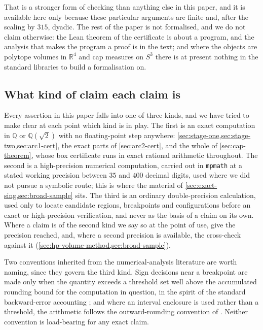 \documentclass[11pt,reqno]{amsart}
\renewcommand{\_}{\origunderscore\allowbreak}
\numberwithin{equation}{section}
\theoremstyle{plain}
\theoremstyle{definition}
\theoremstyle{remark}
\begin{document}
That is a stronger form of checking than anything else in this paper,
and it is available here only because these particular arguments are
finite and, after the scaling by $315$, dyadic. The rest of the paper
is not formalised, and we do not claim otherwise: the Lean theorem of
the certificate is about a program, and the analysis that makes the
program a proof is in the text; and where the objects are polytope
volumes in $\mathbb{R}^4$ and cap measures on $S^3$ there is at present
nothing in the standard libraries to build a formalisation on.

\subsection{What kind of claim each claim is}

Every assertion in this paper falls into one of three kinds, and we have
tried to make clear at each point which kind is in play. The first is an
exact computation in $\mathbb{Q}$ or $\mathbb{Q}(\sqrt2)$ with no
floating-point step anywhere:
\cref{sec:stage-one,sec:stage-two,sec:arc1-cert}, the exact parts of
\cref{sec:arc2-cert}, and the whole of \cref{sec:cap-theorem}, whose
box certificate runs in exact rational arithmetic throughout. The second
is a high-precision numerical computation, carried out in \texttt{mpmath}
at a stated working precision between $35$ and $400$ decimal digits,
used where we did not pursue a symbolic route; this is where the
material of \cref{sec:exact-sing,sec:broad-sample} sits. The third is an
ordinary double-precision calculation, used only to locate candidate
regions, breakpoints and configurations before an exact or
high-precision verification, and never as the basis of a claim on its
own. Where a claim is of the second kind we say so at the point of use,
give the precision reached, and, where a second precision is available,
the cross-check against it (\cref{sec:hp-volume-method,sec:broad-sample}).

Two conventions inherited from the numerical-analysis literature are
worth naming, since they govern the third kind. Sign decisions near a
breakpoint are made only when the quantity exceeds a threshold set well
above the accumulated rounding bound for the computation in question, in
the spirit of the standard backward-error accounting
\cite{GVL13}; and where an interval enclosure is used rather than a
threshold, the arithmetic follows the outward-rounding convention of
\cite{MKC09}. Neither convention is load-bearing for any exact claim.
\end{document}
